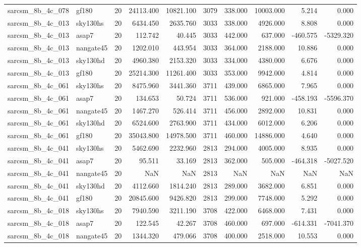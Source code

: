\documentclass{article}
\begin{document}
\begin{longtable}{llrrrrrrrr}
sarcsm\_8b\_4c\_078 & gf180 & 20 & 24113.400 & 10821.100 & 3079 & 338.000 & 10003.000 & 5.214 & 0.000 \\
sarcsm\_8b\_4c\_013 & sky130hs & 20 & 6434.450 & 2635.760 & 3033 & 338.000 & 4926.000 & 8.808 & 0.000 \\
sarcsm\_8b\_4c\_013 & asap7 & 20 & 112.742 & 40.445 & 3033 & 442.000 & 637.000 & -460.575 & -5329.320 \\
sarcsm\_8b\_4c\_013 & nangate45 & 20 & 1202.010 & 443.954 & 3033 & 364.000 & 2188.000 & 10.886 & 0.000 \\
sarcsm\_8b\_4c\_013 & sky130hd & 20 & 4960.380 & 2153.320 & 3033 & 334.000 & 4380.000 & 6.676 & 0.000 \\
sarcsm\_8b\_4c\_013 & gf180 & 20 & 25214.300 & 11261.400 & 3033 & 353.000 & 9942.000 & 4.814 & 0.000 \\
sarcsm\_8b\_4c\_061 & sky130hs & 20 & 8475.960 & 3441.360 & 3711 & 439.000 & 6865.000 & 7.965 & 0.000 \\
sarcsm\_8b\_4c\_061 & asap7 & 20 & 134.653 & 50.724 & 3711 & 536.000 & 921.000 & -458.193 & -5596.370 \\
sarcsm\_8b\_4c\_061 & nangate45 & 20 & 1467.270 & 526.414 & 3711 & 456.000 & 2892.000 & 10.831 & 0.000 \\
sarcsm\_8b\_4c\_061 & sky130hd & 20 & 6524.600 & 2763.900 & 3711 & 434.000 & 6012.000 & 6.206 & 0.000 \\
sarcsm\_8b\_4c\_061 & gf180 & 20 & 35043.800 & 14978.500 & 3711 & 460.000 & 14886.000 & 4.640 & 0.000 \\
sarcsm\_8b\_4c\_041 & sky130hs & 20 & 5462.690 & 2232.960 & 2813 & 294.000 & 4005.000 & 8.935 & 0.000 \\
sarcsm\_8b\_4c\_041 & asap7 & 20 & 95.511 & 33.169 & 2813 & 362.000 & 505.000 & -464.318 & -5027.520 \\
sarcsm\_8b\_4c\_041 & nangate45 & 20 & NaN & NaN & 2813 & NaN & NaN & NaN & NaN \\
sarcsm\_8b\_4c\_041 & sky130hd & 20 & 4112.660 & 1814.240 & 2813 & 289.000 & 3682.000 & 6.851 & 0.000 \\
sarcsm\_8b\_4c\_041 & gf180 & 20 & 20845.600 & 9426.820 & 2813 & 299.000 & 7748.000 & 5.292 & 0.000 \\
sarcsm\_8b\_4c\_018 & sky130hs & 20 & 7940.590 & 3211.190 & 3708 & 422.000 & 6468.000 & 7.431 & 0.000 \\
sarcsm\_8b\_4c\_018 & asap7 & 20 & 122.545 & 42.267 & 3708 & 460.000 & 697.000 & -614.331 & -7041.370 \\
sarcsm\_8b\_4c\_018 & nangate45 & 20 & 1344.320 & 479.066 & 3708 & 400.000 & 2518.000 & 10.553 & 0.000 \\

\end{longtable}
\end{document}
